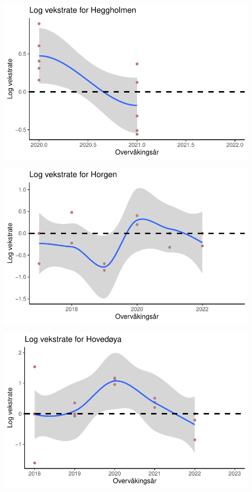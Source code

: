 \documentclass[
  letterpaper,
  DIV=11,
  numbers=noendperiod]{scrreport}
\begin{document}
\includegraphics{growthRate_files/figure-pdf/unnamed-chunk-4-2.pdf}

\includegraphics{growthRate_files/figure-pdf/unnamed-chunk-4-3.pdf}

\includegraphics{growthRate_files/figure-pdf/unnamed-chunk-4-4.pdf}
\end{document}
